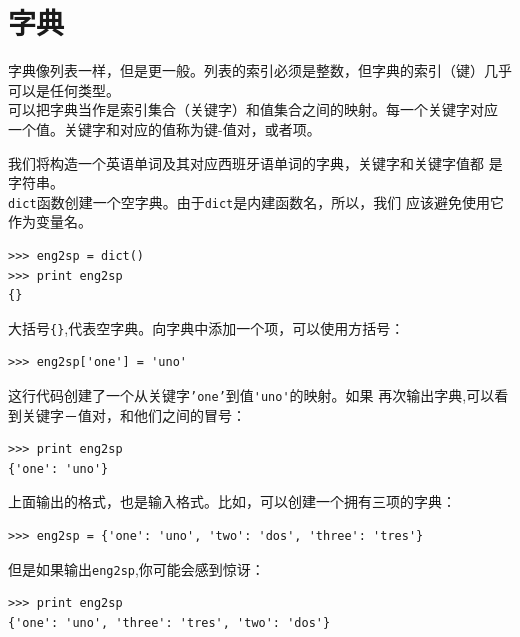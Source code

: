 \chapter{字典}


字典像列表一样，但是更一般。列表的索引必须是整数，但字典的索引（键）几乎可以是任何类型。\\

可以把字典当作是索引集合（关键字）和值集合之间的映射。每一个关键字对应
一个值。关键字和对应的值称为键-值对，或者项。

我们将构造一个英语单词及其对应西班牙语单词的字典，关键字和关键字值都
是字符串。\\

{\tt dict}函数创建一个空字典。由于{\tt dict}是内建函数名，所以，我们
应该避免使用它作为变量名。\\


\beforeverb
\begin{verbatim}
>>> eng2sp = dict()
>>> print eng2sp
{}
\end{verbatim}
\afterverb

大括号\verb"{}",代表空字典。向字典中添加一个项，可以使用方括号：


\beforeverb
\begin{verbatim}
>>> eng2sp['one'] = 'uno'
\end{verbatim}
\afterverb

这行代码创建了一个从关键字{\tt 'one'}到值\verb"'uno'"的映射。如果
再次输出字典,可以看到关键字－值对，和他们之间的冒号：

\beforeverb
\begin{verbatim}
>>> print eng2sp
{'one': 'uno'}
\end{verbatim}
\afterverb

上面输出的格式，也是输入格式。比如，可以创建一个拥有三项的字典：

\beforeverb
\begin{verbatim}
>>> eng2sp = {'one': 'uno', 'two': 'dos', 'three': 'tres'}
\end{verbatim}
\afterverb
%

但是如果输出{\tt eng2sp},你可能会感到惊讶：

\beforeverb
\begin{verbatim}
>>> print eng2sp
{'one': 'uno', 'three': 'tres', 'two': 'dos'}
\end{verbatim}
\afterverb

